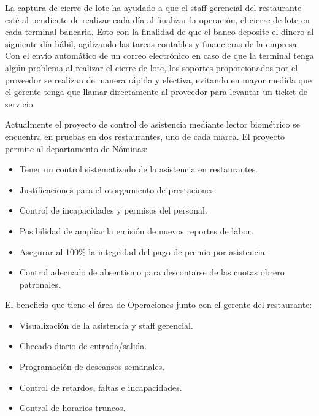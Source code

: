 La captura de cierre de lote ha ayudado a que el staff gerencial del restaurante esté al pendiente de realizar cada día al finalizar la operación, el cierre de lote en cada terminal bancaria. Esto con la finalidad de que el banco deposite el dinero al siguiente día hábil, agilizando las tareas contables y financieras de la empresa. Con el envío automático de un correo electrónico en caso de que la terminal tenga algún problema al realizar el cierre de lote, los soportes proporcionados por el proveedor se realizan de manera rápida y efectiva, evitando en mayor medida que el gerente tenga que llamar directamente al proveedor para levantar un ticket de servicio. 


Actualmente el proyecto de control de asistencia mediante lector biométrico se encuentra en pruebas en dos restaurantes, uno de cada marca. El proyecto permite al departamento de Nóminas:

\begin{itemize}
 \item Tener un control sistematizado de la asistencia en restaurantes.
 \item Justificaciones para el otorgamiento de prestaciones.
 \item Control de incapacidades y permisos del personal.
 \item Posibilidad de ampliar la emisión de nuevos reportes de labor.
 \item Asegurar al 100\% la integridad del pago de premio por asistencia.
 \item Control adecuado de absentismo para descontarse de las cuotas obrero patronales.
\end{itemize}

El beneficio que tiene el área de Operaciones junto con el gerente del restaurante:

\begin{itemize}
 \item Visualización de la asistencia y staff gerencial.
 \item Checado diario de entrada/salida.
 \item Programación de descansos semanales.
 \item Control de retardos, faltas e incapacidades.
 \item Control de horarios truncos.
\end{itemize}

